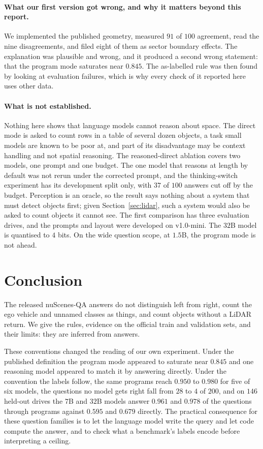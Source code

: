 \documentclass[11pt,a4paper]{article}
\begin{document}
\paragraph{What our first version got wrong, and why it matters beyond this
report.} We implemented the published geometry, measured $91$ of $100$
agreement, read the nine disagreements, and filed eight of them as sector
boundary effects. The explanation was plausible and wrong, and it produced a
second wrong statement: that the program mode saturates near $0.845$. The
as-labelled rule was then found by looking at evaluation failures, which is
why every check of it reported here uses other data.

\paragraph{What is not established.} Nothing here shows that language models
cannot reason about space. The direct mode is asked to count rows in a table
of several dozen objects, a task small models are known to be poor at, and
part of its disadvantage may be context handling and not spatial reasoning.
The reasoned-direct ablation covers two models, one prompt and one budget.
The one model that reasons at length by default was not rerun under the
corrected prompt, and the thinking-switch experiment has its development
split only, with $37$ of $100$ answers cut off by the budget. Perception is an oracle, so the result says nothing about a system
that must detect objects first; given Section~\ref{sec:lidar}, such a system
would also be asked to count objects it cannot see. The first comparison has
three evaluation drives, and the prompts and layout were developed on
v1.0-mini. The $32$B model is quantised to $4$ bits. On the wide question
scope, at $1.5$B, the program mode is not ahead.

\section{Conclusion}

The released nuScenes-QA answers do not distinguish left from right, count
the ego vehicle and unnamed classes as things, and count objects without a
LiDAR return. We give the rules, evidence on the official train and
validation sets, and their limits: they are inferred from answers.

These conventions changed the reading of our own experiment. Under the
published definition the program mode appeared to saturate near $0.845$ and
one reasoning model appeared to match it by answering directly. Under the
convention the labels follow, the same programs reach $0.950$ to $0.980$ for
five of six models, the questions no model gets right fall from $28$ to $4$
of $200$, and on $146$ held-out drives the $7$B and $32$B models answer $0.961$ and
$0.978$ of the questions through programs against $0.595$ and $0.679$
directly. The practical consequence
for these question families is to let the language model write the query and
let code compute the answer, and to check what a benchmark's labels encode
before interpreting a ceiling.
\end{document}
